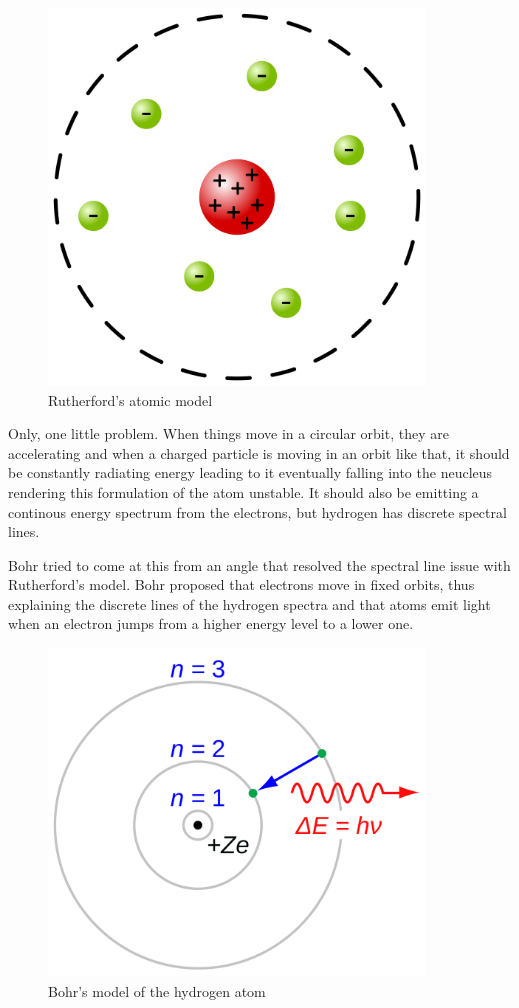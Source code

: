 \begin{figure}[H]
  \centering
  \includegraphics[width=100mm]{figures/rutherford.png}
  \caption{Rutherford's atomic model}
  \label{rutherford}
\end{figure}

Only, one little problem.
When things move in a circular orbit, they are accelerating and when a charged particle is moving in an orbit like that,  it should be constantly radiating energy leading to it eventually falling into the neucleus rendering this formulation of the atom unstable.
It should also be emitting a continous energy spectrum from the electrons, but hydrogen has discrete spectral lines.

Bohr tried to come at this from an angle that resolved the spectral line issue with Rutherford's model.
Bohr proposed that electrons move in fixed orbits, thus explaining the discrete lines of the hydrogen spectra and that atoms emit light when an electron jumps from a higher energy level to a lower one.

\begin{figure}[H]
  \centering
  \includegraphics[width=100mm]{figures/bohr.png}
  \caption{Bohr's model of the hydrogen atom}
  \label{bohr}
\end{figure}

